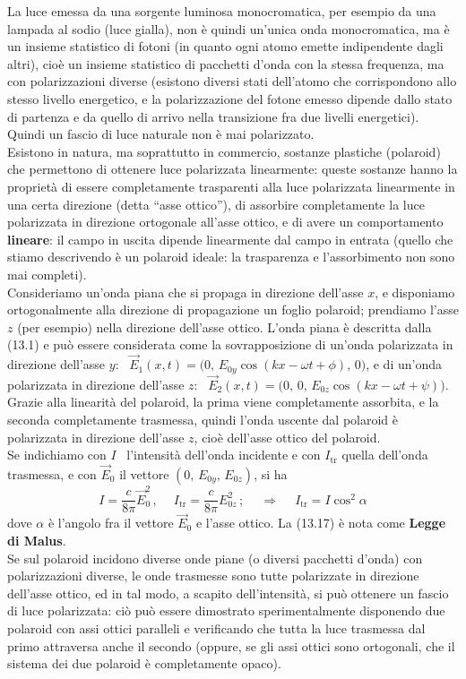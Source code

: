 La luce emessa da una sorgente luminosa monocromatica, per esempio da una
lampada al sodio (luce gialla), non \`e quindi un'unica onda monocromatica, ma
\`e un insieme statistico di fotoni (in quanto ogni atomo emette indipendente
dagli altri), cio\`e un insieme statistico di pacchetti d'onda con la stessa
frequenza, ma con polarizzazioni diverse (esistono diversi stati dell'atomo che
corrispondono allo stesso livello energetico, e la polarizzazione del fotone
emesso dipende dallo stato di partenza e da quello di arrivo nella transizione
fra due livelli energetici). Quindi un fascio di luce naturale non \`e mai
polarizzato.\\
Esistono in natura, ma soprattutto in commercio, sostanze plastiche (polaroid)
che permettono di ottenere luce polarizzata linearmente: queste sostanze hanno
la propriet\`a di essere completamente trasparenti alla luce polarizzata
linearmente in una certa direzione (detta ``asse ottico''), di assorbire
completamente la luce polarizzata in direzione ortogonale all'asse ottico, e di
avere un comportamento \textbf{lineare}: il campo in uscita dipende linearmente
dal campo in entrata (quello che stiamo descrivendo \`e un polaroid ideale: la
trasparenza e l'assorbimento non sono mai completi).\\
Consideriamo un'onda piana che si propaga in direzione dell'asse $x$, e
disponiamo ortogonalmente alla direzione di propagazione un foglio polaroid;
prendiamo l'asse $z$ (per esempio) nella direzione dell'asse ottico. L'onda
piana \`e descritta dalla (13.1) e pu\`o essere considerata come la
sovrapposizione di un'onda polarizzata in direzione dell'asse $y$:
\ $\vec E_1(x,t)=\big(0,\,E_{0y}\cos(kx-\omega t+\phi),\,0\big)$, e di un'onda
polarizzata in direzione dell'asse $z$:
\ $\vec E_2(x,t)=\big(0,\,0,\,E_{0z}\cos(kx-\omega t+\psi)\big)$. Grazie alla
linearit\`a del polaroid, la prima viene completamente assorbita, e la seconda
completamente trasmessa, quindi l'onda uscente dal polaroid \`e polarizzata in
direzione dell'asse $z$, cio\`e dell'asse ottico del polaroid.\\
Se indichiamo con $I$ \ l'intensit\`a dell'onda incidente e con $I_\mathrm{tr}$
quella dell'onda trasmessa, e con $\vec E_0$ il vettore $(0,\,E_{0y},\,E_{0z})$,
si ha
\begin{equation}
  I=\frac{c}{8\pi}\vec E_0^2\,,\quad\ I_\mathrm{tr}=\frac{c}{8\pi}E_{0z}^2\,;
  \quad\ \Rightarrow\quad\ I_\mathrm{tr}=I\cos^2\alpha
  \tag{13.17}
\end{equation}
dove $\alpha$ \`e l'angolo fra il vettore $\vec E_0$ e l'asse ottico. La (13.17)
\`e nota come \textbf{Legge di Malus}.\\
Se sul polaroid incidono diverse onde piane (o diversi pacchetti d'onda) con
polarizzazioni diverse, le onde trasmesse sono tutte polarizzate in direzione
dell'asse ottico, ed in tal modo, a scapito dell'intensit\`a, si pu\`o ottenere
un fascio di luce polarizzata: ci\`o pu\`o essere dimostrato sperimentalmente
disponendo due polaroid con assi ottici paralleli e verificando che tutta la
luce trasmessa dal primo attraversa anche il secondo (oppure, se gli assi ottici
sono ortogonali, che il sistema dei due polaroid \`e completamente opaco).


